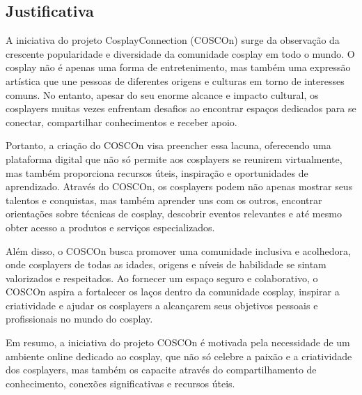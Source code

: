 \documentclass[12pt,a4paper,chapter=TITLE,section=TITLE,subsection=TITLE,subsubsection=TITLE]{article}
\begin{document}
\subsection{Justificativa}    

A iniciativa do projeto CosplayConnection (COSCOn) surge da observação da crescente popularidade e diversidade da comunidade cosplay em todo o mundo. O cosplay não é apenas uma forma de entretenimento, mas também uma expressão artística que une pessoas de diferentes origens e culturas em torno de interesses comuns. No entanto, apesar do seu enorme alcance e impacto cultural, os cosplayers muitas vezes enfrentam desafios ao encontrar espaços dedicados para se conectar, compartilhar conhecimentos e receber apoio.

Portanto, a criação do COSCOn visa preencher essa lacuna, oferecendo uma plataforma digital que não só permite aos cosplayers se reunirem virtualmente, mas também proporciona recursos úteis, inspiração e oportunidades de aprendizado. Através do COSCOn, os cosplayers podem não apenas mostrar seus talentos e conquistas, mas também aprender uns com os outros, encontrar orientações sobre técnicas de cosplay, descobrir eventos relevantes e até mesmo obter acesso a produtos e serviços especializados.

Além disso, o COSCOn busca promover uma comunidade inclusiva e acolhedora, onde cosplayers de todas as idades, origens e níveis de habilidade se sintam valorizados e respeitados. Ao fornecer um espaço seguro e colaborativo, o COSCOn aspira a fortalecer os laços dentro da comunidade cosplay, inspirar a criatividade e ajudar os cosplayers a alcançarem seus objetivos pessoais e profissionais no mundo do cosplay.

Em resumo, a iniciativa do projeto COSCOn é motivada pela necessidade de um ambiente online dedicado ao cosplay, que não só celebre a paixão e a criatividade dos cosplayers, mas também os capacite através do compartilhamento de conhecimento, conexões significativas e recursos úteis.
\end{document}
